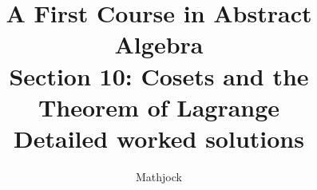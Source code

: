 
\title{\textbf{A First Course in Abstract Algebra}\\[0.3em]Section 10: Cosets and the Theorem of Lagrange\\[0.3em]\large Detailed worked solutions}
\author{Mathjock}
\date{}

\maketitle
\bookinfo
\tableofcontents
\clearpage
\renewcommand{\thesection}{10}
\renewcommand{\theHsection}{fraleigh.10}


